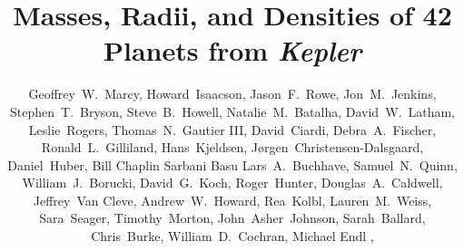 \documentclass{emulateapj}
\begin{document}
{}


\title{Masses, Radii, and Densities of 42 Planets from {\it Kepler} \altaffilmark{$\dagger$}}

\author{
Geoffrey~W.~Marcy,  %
Howard~Isaacson,  %
Jason~F.~Rowe, %
Jon~M.~Jenkins, %
Stephen~T.~Bryson, %
Steve~B.~Howell, %
Natalie~M.~Batalha, %
David~W.~Latham, %
Leslie~Rogers, %
Thomas~N.~Gautier III, %
David~Ciardi, %
Debra~A.~Fischer, %
Ronald~L.~Gilliland, %
Hans~Kjeldsen, %
J{\o}rgen~Christensen-Dalsgaard, %
Daniel~Huber,  %
Bill Chaplin %
Sarbani Basu %
Lars~A.~Buchhave, %
Samuel~N.~Quinn, %
William~J.~Borucki, %
David~G.~Koch, %
Roger~Hunter, %
Douglas~A.~Caldwell, %
Jeffrey~Van Cleve, %
Andrew~W.~Howard,  %
Rea~Kolbl,  %
Lauren~M.~Weiss,  %
Sara~Seager, %
Timothy~Morton, %
John~Asher~Johnson, %
Sarah~Ballard,  %
Chris~Burke,   %
William~D.~Cochran, %
Michael Endl , %
}
\end{document}
